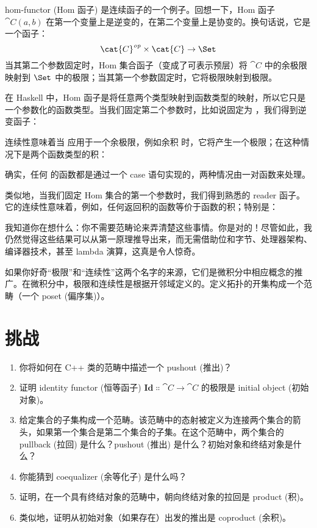 hom-functor (Hom 函子) 是连续函子的一个例子。回想一下，Hom 函子 $\cat{C}(a, b)$ 在第一个变量上是逆变的，在第二个变量上是协变的。换句话说，它是一个函子：
\[\cat{C}^\mathit{op} \times \cat{C} \to \Set\]
当其第二个参数固定时，Hom 集合函子（变成了可表示预层）将 $\cat{C}$ 中的余极限映射到 $\Set$ 中的极限；当其第一个参数固定时，它将极限映射到极限。

在 Haskell 中，Hom 函子是将任意两个类型映射到函数类型的映射，所以它只是一个参数化的函数类型。当我们固定第二个参数时，比如说固定为 ，我们得到逆变函子：

连续性意味着当  应用于一个余极限，例如余积  时，它将产生一个极限；在这种情况下是两个函数类型的积：

确实，任何  的函数都是通过一个 case 语句实现的，两种情况由一对函数来处理。

类似地，当我们固定 Hom 集合的第一个参数时，我们得到熟悉的 reader 函子。它的连续性意味着，例如，任何返回积的函数等价于函数的积；特别是：

我知道你在想什么：你不需要范畴论来弄清楚这些事情。你是对的！尽管如此，我仍然觉得这些结果可以从第一原理推导出来，而无需借助位和字节、处理器架构、编译器技术，甚至 lambda 演算，这真是令人惊奇。

如果你好奇“极限”和“连续性”这两个名字的来源，它们是微积分中相应概念的推广。在微积分中，极限和连续性是根据开邻域定义的。定义拓扑的开集构成一个范畴（一个 poset (偏序集)）。

\section{挑战}

\begin{enumerate}
  \tightlist
  \item
        你将如何在 C++ 类的范畴中描述一个 pushout (推出)？
  \item
        证明 identity functor (恒等函子) $\mathbf{Id} \Colon \cat{C} \to \cat{C}$ 的极限是 initial object (初始对象)。
  \item
        给定集合的子集构成一个范畴。该范畴中的态射被定义为连接两个集合的箭头，如果第一个集合是第二个集合的子集。在这个范畴中，两个集合的 pullback (拉回) 是什么？pushout (推出) 是什么？初始对象和终结对象是什么？
  \item
        你能猜到 coequalizer (余等化子) 是什么吗？
  \item
        证明，在一个具有终结对象的范畴中，朝向终结对象的拉回是 product (积)。
  \item
        类似地，证明从初始对象（如果存在）出发的推出是 coproduct (余积)。
\end{enumerate}